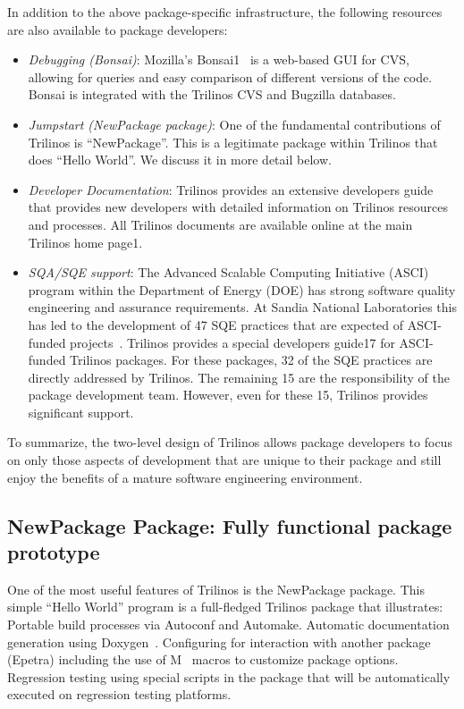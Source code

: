 \documentclass[]{llncs}      %
\begin{document}
In addition to the above package-specific infrastructure, the following
resources are also available to package developers: 
\begin{itemize}
\item {\sl Debugging (Bonsai)}:
Mozilla’s Bonsai1~\cite{4} is a web-based GUI for CVS, allowing for
queries and easy comparison of different versions of the code. Bonsai is
integrated with the Trilinos CVS and Bugzilla databases.  
\item {\sl Jumpstart
(NewPackage package)}: One of the fundamental contributions of Trilinos
is “NewPackage”.  This is a legitimate package within Trilinos that does
“Hello World”.  We discuss it in more detail below.  
\item {\sl Developer
Documentation}: Trilinos provides an extensive developers guide~\cite{15}
that provides new developers with detailed information on Trilinos
resources and processes.  All Trilinos documents are available online at
the main Trilinos home page1.  
\item {\sl SQA/SQE support}: The Advanced Scalable
Computing Initiative (ASCI) program within the Department of Energy
(DOE) has strong software quality engineering and assurance
requirements.  At Sandia National Laboratories this has led to the
development of 47 SQE practices that are expected of ASCI-funded
projects~\cite{16}.  Trilinos provides a special developers guide17 for
ASCI-funded Trilinos packages.  For these packages, 32 of the SQE
practices are directly addressed by Trilinos.  The remaining 15 are the
responsibility of the package development team.  However, even for these
15, Trilinos provides significant support.  
\end{itemize}

To summarize, the two-level design of Trilinos allows package developers
to focus on only those aspects of development that are unique to their
package and still enjoy the benefits of a mature software engineering
environment.


\subsection*{NewPackage Package: Fully functional package prototype}

One of the most useful features of Trilinos is the NewPackage package.
 This simple “Hello World” program is a full-fledged Trilinos package
 that illustrates: Portable build processes via Autoconf and Automake.
 Automatic documentation generation using Doxygen~\cite{18}.
 Configuring for interaction with another package (Epetra) including the
 use of M~\cite{4,19} macros to customize package options.  Regression
 testing using special scripts in the package that will be automatically
 executed on regression testing platforms.
\end{document}
